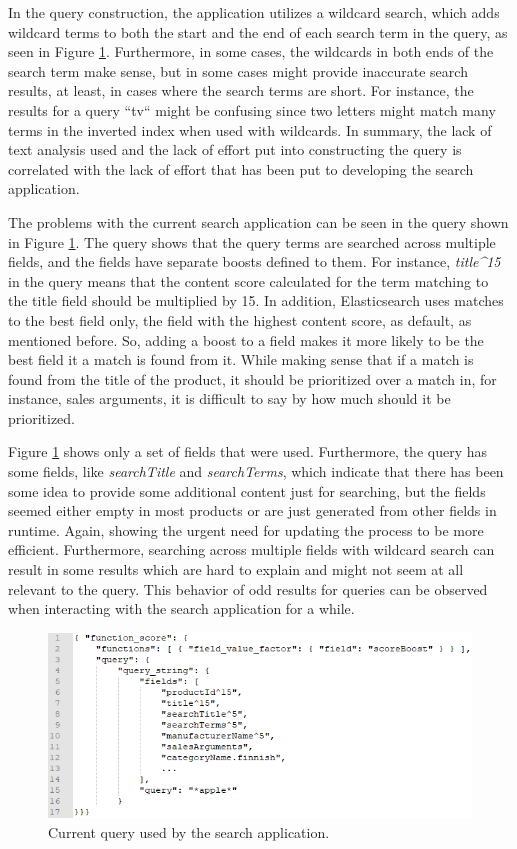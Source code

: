 In the query construction, the application utilizes a wildcard search, which adds wildcard terms to both
the start and the end of each search term in the query, as seen in Figure \ref{fig:current-query}.
Furthermore, in some cases, the wildcards in both ends of the search term make sense, but in some cases
might provide inaccurate search results, at least, in cases where the search terms are short.
For instance, the results for a query ``tv`` might be confusing since two letters might match 
many terms in the inverted index when used with wildcards.
In summary, the lack of text analysis used and the lack of effort put into constructing the query is 
correlated with the lack of effort that has been put to developing the search application.


The problems with the current search application can be seen in the query shown in Figure \ref{fig:current-query}.
The query shows that the query terms are searched across multiple fields, 
and the fields have separate boosts defined to them. 
For instance, \emph{title\textasciicircum15} in the query means that the content score calculated for the term matching to the title field
should be multiplied by 15.
In addition, Elasticsearch uses matches to the best field only, 
the field with the highest content score, as default, as mentioned before. 
So, adding a boost to a field makes it more likely to be the best field it a match is found from it.
While making sense that if a match is found from the title of the product, it should be prioritized over
a match in, for instance, sales arguments, it is difficult to say by how much should it be prioritized.


Figure \ref{fig:current-query} shows only a set of fields that were used.
Furthermore, the query has some fields, like \emph{searchTitle}  and \emph{searchTerms}, which indicate
that there has been some idea to provide some additional content just for searching,
but the fields seemed either empty in most products or are just generated from other fields in runtime.
Again, showing the urgent need for updating the process to be more efficient.
Furthermore, searching across multiple fields with wildcard search can result in some results
which are hard to explain and might not seem at all relevant to the query.
This behavior of odd results for queries can be observed when interacting with the search application
for a while.


\begin{figure}
    \centering
    \includegraphics[width=\textwidth]{img/current-query.png}
    \caption{Current query used by the search application.}
    \label{fig:current-query}
\end{figure}


